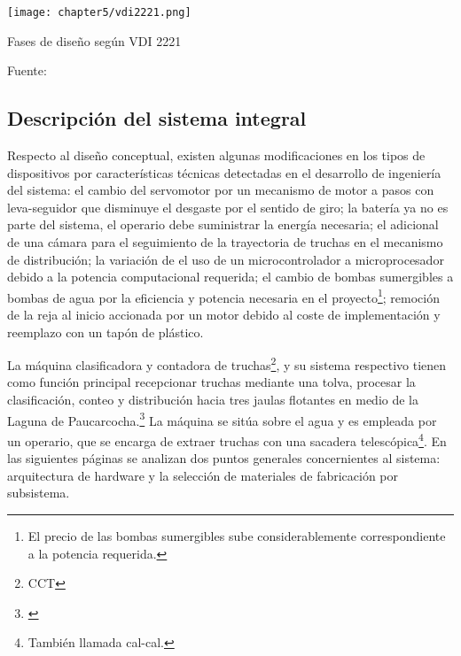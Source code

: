 \begin{myfigure}[H]
	\centering
	\texttt{[image: chapter5/vdi2221.png]}
	\caption{Fases de diseño según VDI 2221}
	\begin{myflushleftportland}
		Fuente: \cite{Pahl2007}
	\end{myflushleftportland}
	\label{fig:vdi2221}
\end{myfigure}



\subsection{Descripción del sistema integral}
\label{ssec:descripcion del sistema integral}

Respecto al diseño conceptual, existen algunas modificaciones en los tipos de dispositivos por características técnicas detectadas en el desarrollo de ingeniería del sistema: el cambio del servomotor por un mecanismo de motor a pasos con leva-seguidor que disminuye el desgaste por el sentido de giro; la batería ya no es parte del sistema, el operario debe suministrar la energía necesaria; el adicional de una cámara para el seguimiento de la trayectoria de truchas en el mecanismo de distribución; la variación de el uso de un microcontrolador a microprocesador debido a la potencia computacional requerida; el cambio de bombas sumergibles a bombas de agua por la eficiencia y potencia necesaria en el proyecto\footnote{El precio de las bombas sumergibles sube considerablemente correspondiente a la potencia requerida.}; remoción de la reja al inicio accionada por un motor debido al coste de implementación y reemplazo con un tapón de plástico.

La máquina clasificadora y contadora de truchas\footnote{CCT}, y su sistema respectivo tienen como función principal recepcionar truchas mediante una tolva, procesar la clasificación, conteo y distribución hacia tres jaulas flotantes en medio de la Laguna de Paucarcocha.\footnote{\cite{DiazVergara2020}} La máquina se sitúa sobre el agua y es empleada por un operario, que se encarga de extraer truchas con una sacadera telescópica\footnote{También llamada cal-cal.}. En las siguientes páginas se analizan dos puntos generales concernientes al sistema: arquitectura de hardware y la selección de materiales de fabricación por subsistema.


